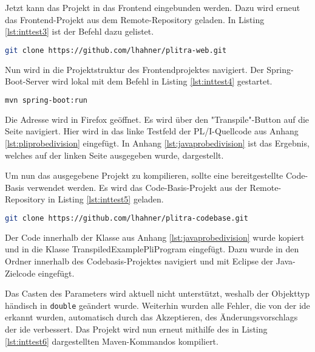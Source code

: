Jetzt kann das Projekt in das Frontend eingebunden werden. Dazu wird erneut das Frontend-Projekt aus dem Remote-Repository geladen. In Listing \ref{lst:inttest3} ist der Befehl dazu gelistet.

\begin{lstlisting}[language=Bash, caption=Laden des Frontend-Projekts, label={lst:inttest3}]
git clone https://github.com/lhahner/plitra-web.git
\end{lstlisting}

Nun wird in die Projektstruktur des Frontendprojektes navigiert. Der Spring-Boot-Server wird lokal mit dem Befehl in Listing \ref{lst:inttest4} gestartet.

\begin{lstlisting}[language=Bash, caption=Starten des Spring-Boot-Servers, label={lst:inttest4}]
mvn spring-boot:run
\end{lstlisting}

Die Adresse  wird in Firefox geöffnet. Es wird über den "Transpile"-Button auf die Seite  navigiert. Hier wird in das linke Testfeld der PL/I-Quellcode aus Anhang \ref{lst:pliprobedivision} eingefügt. In Anhang \ref{lst:javaprobedivision} ist das Ergebnis, welches auf der linken Seite ausgegeben wurde, dargestellt.

Um nun das ausgegebene Projekt zu kompilieren, sollte eine bereitgestellte Code-Basis verwendet werden. Es wird das Code-Basis-Projekt aus der Remote-Repository in Listing \ref{lst:inttest5} geladen.

\begin{lstlisting}[language=Bash, caption=Laden der Code-Basis, label={lst:inttest5}]
git clone https://github.com/lhahner/plitra-codebase.git
\end{lstlisting}

Der Code innerhalb der Klasse aus Anhang \ref{lst:javaprobedivision} wurde kopiert und in die Klasse TranspiledExamplePliProgram eingefügt. Dazu wurde in den Ordner  innerhalb des Codebasis-Projektes navigiert und mit Eclipse der Java-Zielcode eingefügt.

Das Casten des Parameters wird aktuell nicht unterstützt, weshalb der Objekttyp händisch
in \verb+double+ geändert wurde. Weiterhin wurden alle Fehler, die von der \ac{ide} erkannt wurden, automatisch durch das Akzeptieren, des Änderungsvorschlags der  \ac{ide}  verbessert.
Das Projekt wird nun erneut mithilfe des in Listing \ref{lst:inttest6} dargestellten Maven-Kommandos kompiliert.

